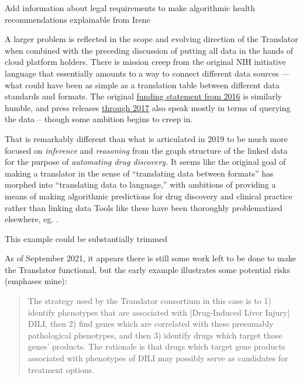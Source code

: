 \documentclass[10pt]{article}
\begin{document}
\begin{multicols}{2}
Add information about legal requirements to make algorithmic health
recommendations explainable from Irene

A larger problem is reflected in the scope and evolving direction of the
Translator when combined with the preceding discussion of putting all
data in the hands of cloud platform holders. There is mission creep from
the original NIH initiative language that essentially amounts to a way
to connect different data sources --- what could have been as simple as
a translation table between different data standards and formats. The
original
\href{https://web.archive.org/web/20210709100523/https://ncats.nih.gov/news/releases/2016/feasibility-assessment-translator}{funding
statement from 2016} is similarly humble, and press releases
\href{https://web.archive.org/web/20210709171335/https://ncats.nih.gov/pubs/features/translator}{through
2017} also speak mostly in terms of querying the data -- though some
ambition begins to creep in.

That is remarkably different than what is articulated in 2019 \cite{consortiumUniversalBiomedicalData2019}  to be much more focused on
\emph{inference} and \emph{reasoning} from the graph structure of the
linked data for the purpose of \emph{automating drug discovery.} It
seems like the original goal of making a translator in the sense of
``translating data between formats'' has morphed into ``translating data
to language,'' with ambitions of providing a means of making algorithmic
predictions for drug discovery and clinical practice rather than linking
data \cite{hailuNIHfundedProjectAims2019}  Tools like these have
been thoroughly problematized elsewhere, eg. \cite{groteEthicsAlgorithmicDecisionmaking2020, obermeyerDissectingRacialBias2019, panchArtificialIntelligenceAlgorithmic2019, panchInconvenientTruthAI2019} .

This example could be substantially trimmed

As of September 2021, it appears there is still some work left to be
done to make the Translator functional, but the early example
illustrates some potential risks (emphases mine):

\begin{quote}
The strategy used by the Translator consortium in this case is to 1)
identify phenotypes that are associated with {[}Drug-Induced Liver
Injury{]} DILI, then 2) find genes which are correlated with these
presumably pathological phenotypes, and then 3) identify drugs which
target those genes' products. The rationale is that drugs which target
gene products associated with phenotypes of DILI may possibly serve as
candidates for treatment options.


\end{quote}
\end{multicols}
\end{document}
